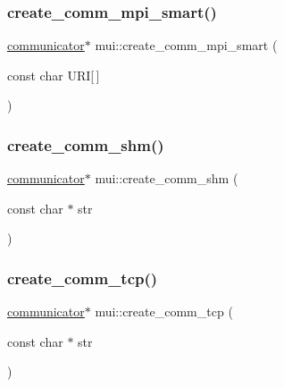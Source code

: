 \mbox{\label{namespacemui_a534f89c7f4a430bc9172a2f1fcb520ec}} 
\subsubsection{\texorpdfstring{create\+\_\+comm\+\_\+mpi\+\_\+smart()}{create\_comm\_mpi\_smart()}}
{\footnotesize\ttfamily \hyperlink{classmui_1_1communicator}{communicator}$\ast$ mui\+::create\+\_\+comm\+\_\+mpi\+\_\+smart (\begin{DoxyParamCaption}\item[{const char}]{U\+RI\mbox{[}$\,$\mbox{]} }\end{DoxyParamCaption})\hspace{0.3cm}{\ttfamily [inline]}}

\mbox{\label{namespacemui_aaa023087095503bcc805eda93a955a89}} 
\subsubsection{\texorpdfstring{create\+\_\+comm\+\_\+shm()}{create\_comm\_shm()}}
{\footnotesize\ttfamily \hyperlink{classmui_1_1communicator}{communicator}$\ast$ mui\+::create\+\_\+comm\+\_\+shm (\begin{DoxyParamCaption}\item[{const char $\ast$}]{str }\end{DoxyParamCaption})\hspace{0.3cm}{\ttfamily [inline]}}

\mbox{\label{namespacemui_a09c34bd34d9ffe80b43b9a2d58c44834}} 
\subsubsection{\texorpdfstring{create\+\_\+comm\+\_\+tcp()}{create\_comm\_tcp()}}
{\footnotesize\ttfamily \hyperlink{classmui_1_1communicator}{communicator}$\ast$ mui\+::create\+\_\+comm\+\_\+tcp (\begin{DoxyParamCaption}\item[{const char $\ast$}]{str }\end{DoxyParamCaption})\hspace{0.3cm}{\ttfamily [inline]}}

